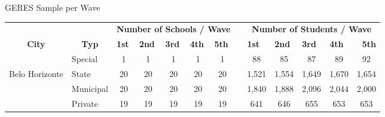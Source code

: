 \documentclass{beamer}
\begin{document}
\begin{frame}[label=SampleWave]{GERES Sample per Wave}
\vspace{-27pt} \flushright \hyperlink{Main2}{\beamerbutton{\textcolor{red}{Back}}}
\vspace{30pt}
\begin{table}[H]
  \begin{adjustbox}{max width=\textwidth}
    \begin{tabular}{llllllllllllr}
    \toprule
          &       & \multicolumn{5}{c}{\textbf{Number of Schools / Wave}} &       & \multicolumn{5}{c}{\textbf{Number of Students / Wave}} \\
\cmidrule{3-7}\cmidrule{9-13}    \multicolumn{1}{c}{\textbf{City}} & \multicolumn{1}{c}{\textbf{Typ}} & \multicolumn{1}{p{3.445em}}{\textbf{ 1st }} & \multicolumn{1}{p{3.445em}}{\textbf{ 2nd  }} & \multicolumn{1}{p{3.445em}}{\textbf{ 3rd  }} & \multicolumn{1}{p{3.445em}}{\textbf{ 4th  }} & \multicolumn{1}{p{3.445em}}{\textbf{ 5th  }} &       & \multicolumn{1}{p{3.445em}}{\textbf{ 1st }} & \multicolumn{1}{p{3.445em}}{\textbf{ 2nd  }} & \multicolumn{1}{p{3.445em}}{\textbf{ 3rd  }} & \multicolumn{1}{p{3.445em}}{\textbf{ 4th  }} & \multicolumn{1}{p{3.445em}}{\textbf{ 5th  }} \\
\cmidrule{1-7}\cmidrule{9-13}          & Special & \multicolumn{1}{c}{1 } & \multicolumn{1}{c}{1 } & \multicolumn{1}{c}{1 } & \multicolumn{1}{c}{1 } & \multicolumn{1}{c}{1 } &       & \multicolumn{1}{c}{88 } & \multicolumn{1}{c}{85 } & \multicolumn{1}{c}{87 } & \multicolumn{1}{c}{89 } & \multicolumn{1}{c}{92 } \\
    Belo Horizonte & State & \multicolumn{1}{c}{20 } & \multicolumn{1}{c}{20 } & \multicolumn{1}{c}{20 } & \multicolumn{1}{c}{20 } & \multicolumn{1}{c}{20 } &       & \multicolumn{1}{c}{1,521 } & \multicolumn{1}{c}{1,554 } & \multicolumn{1}{c}{1,649 } & \multicolumn{1}{c}{1,670 } & \multicolumn{1}{c}{1,654 } \\
          & Municipal & \multicolumn{1}{c}{20 } & \multicolumn{1}{c}{20 } & \multicolumn{1}{c}{20 } & \multicolumn{1}{c}{20 } & \multicolumn{1}{c}{20 } &       & \multicolumn{1}{c}{1,840 } & \multicolumn{1}{c}{1,888} & \multicolumn{1}{c}{2,096 } & \multicolumn{1}{c}{2,044 } & \multicolumn{1}{c}{2,000 } \\
          & Private & \multicolumn{1}{c}{19 } & \multicolumn{1}{c}{19 } & \multicolumn{1}{c}{19 } & \multicolumn{1}{c}{19 } & \multicolumn{1}{c}{19 } &       & \multicolumn{1}{c}{641 } & \multicolumn{1}{c}{646 } & \multicolumn{1}{c}{655 } & \multicolumn{1}{c}{653 } & \multicolumn{1}{c}{653 } \\

\end{tabular}
\end{adjustbox}
\end{table}
\end{frame}
\end{document}
